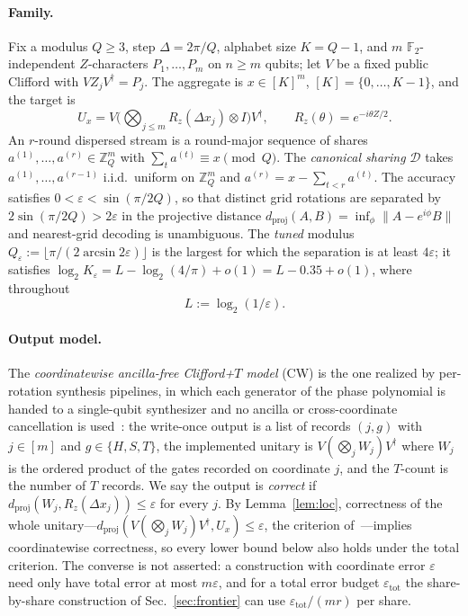 \documentclass[aps,prx,twocolumn,superscriptaddress,nofootinbib,longbibliography]{revtex4-2}
\theoremstyle{plain}
\theoremstyle{definition}
\theoremstyle{remark}
\newcommand{\dproj}{d_{\mathrm{proj}}}
\newcommand{\Z}{\mathbb{Z}}
\newcommand{\F}{\mathbb{F}}
\begin{document}
\paragraph{Family.} Fix a modulus $Q\ge3$, step $\Delta=2\pi/Q$, alphabet size $K=Q-1$, and $m$ $\F_2$-independent $Z$-characters $P_1,\dots,P_m$ on $n\ge m$ qubits; let $V$ be a fixed public Clifford with $VZ_jV^\dagger=P_j$. The aggregate is $x\in[K]^m$, $[K]=\{0,\dots,K-1\}$, and the target is
\begin{equation}
U_x=V\Big(\bigotimes_{j\le m}R_z(\Delta x_j)\otimes I\Big)V^\dagger,\qquad R_z(\theta)=e^{-i\theta Z/2}.
\end{equation}
An $r$-round dispersed stream is a round-major sequence of shares $a^{(1)},\dots,a^{(r)}\in\Z_Q^m$ with $\sum_ta^{(t)}\equiv x\pmod Q$. The \emph{canonical sharing} $\mathcal D$ takes $a^{(1)},\dots,a^{(r-1)}$ i.i.d.\ uniform on $\Z_Q^m$ and $a^{(r)}=x-\sum_{t<r}a^{(t)}$. The accuracy satisfies $0<\varepsilon<\sin(\pi/2Q)$, so that distinct grid rotations are separated by $2\sin(\pi/2Q)>2\varepsilon$ in the projective distance $\dproj(A,B)=\inf_\phi\|A-e^{i\phi}B\|$ and nearest-grid decoding is unambiguous. The \emph{tuned} modulus $Q_\varepsilon:=\lfloor\pi/(2\arcsin2\varepsilon)\rfloor$ is the largest for which the separation is at least $4\varepsilon$; it satisfies $\log_2K_\varepsilon=L-\log_2(4/\pi)+o(1)=L-0.35+o(1)$, where throughout
\begin{equation}
L:=\log_2(1/\varepsilon).
\end{equation}

\paragraph{Output model.} The \emph{coordinatewise ancilla-free Clifford+$T$ model} (CW) is the one realized by per-rotation synthesis pipelines, in which each generator of the phase polynomial is handed to a single-qubit synthesizer and no ancilla or cross-coordinate cancellation is used~\cite{RossSelinger,Paper1}: the write-once output is a list of records $(j,g)$ with $j\in[m]$ and $g\in\{H,S,T\}$, the implemented unitary is $V(\bigotimes_jW_j)V^\dagger$ where $W_j$ is the ordered product of the gates recorded on coordinate $j$, and the $T$-count is the number of $T$ records. We say the output is \emph{correct} if $\dproj(W_j,R_z(\Delta x_j))\le\varepsilon$ for every $j$. By Lemma~\ref{lem:loc}, correctness of the whole unitary---$\dproj(V(\bigotimes_jW_j)V^\dagger,U_x)\le\varepsilon$, the criterion of~\cite{Paper1}---implies coordinatewise correctness, so every lower bound below also holds under the total criterion. The converse is not asserted: a construction with coordinate error $\varepsilon$ need only have total error at most $m\varepsilon$, and for a total error budget $\varepsilon_{\mathrm{tot}}$ the share-by-share construction of Sec.~\ref{sec:frontier} can use $\varepsilon_{\mathrm{tot}}/(mr)$ per share.
\end{document}
